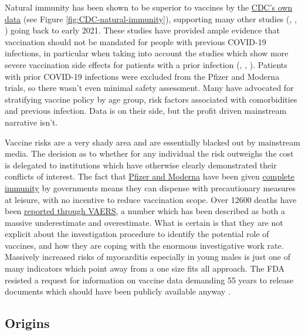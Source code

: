 \documentclass[11pt,a4paper,notitlepage]{report}
\begin{document}
Natural immunity has been shown to be superior to vaccines by the \href{https://www.cdc.gov/mmwr/volumes/71/wr/mm7104e1.htm#F1_down}{CDC's own data} \cite{cdc28012020} (see Figure \ref{fig:CDC-natural-immunity}), supporting many other studies (\cite{Gazit2021.08.24.21262415}, \cite{doi:10.1126/science.abf4063}, \cite{Goldberg2021.04.20.21255670}) going back to early 2021. These studies have provided ample evidence that vaccination should not be mandated for people with previous COVID-19 infections, in particular when taking into account the studies which show more severe vaccination side effects for patients with a prior infection (\cite{Monforte2021}, \cite{LI20221082}, \cite{Raw22}). Patients with prior COVID-19 infections were excluded from the Pfizer and Moderna trials, so there wasn't even minimal safety assessment. Many have advocated for stratifying vaccine policy by age group, risk factors associated with comorbidities and previous infection. Data is on their side, but the profit driven mainstream narrative isn't.


Vaccine risks are a very shady area and are essentially blacked out by mainstream media. The decision as to whether for any individual the risk outweighs the cost is delegated to institutions which have otherwise clearly demonstrated their conflicts of interest. The fact that \href{https://www.cnbc.com/2020/12/16/covid-vaccine-side-effects-compensation-lawsuit.html}{Pfizer and Moderna} have been given \href{https://crsreports.congress.gov/product/pdf/LSB/LSB10443}{complete immunity} by governments means they can dispense with precautionary measures at leisure, with no incentive to reduce vaccination scope. Over 12600 deaths have been \href{https://www.cdc.gov/coronavirus/2019-ncov/vaccines/safety/adverse-events.html}{reported through VAERS}, a number which has been described as both a massive underestimate and overestimate. What is certain is that they are not explicit about the investigation procedure to identify the potential role of vaccines, and how they are coping with the enormous investigative work rate. Massively increased risks of myocarditis especially in young males \cite{10.1001/jama.2021.24110} is just one of many indicators which point away from a one size fits all approach. The FDA resisted a request for information on vaccine data demanding 55 years to release documents which should have been publicly available anyway \cite{mailonline19112021}.



\subsection*{Origins}
\end{document}

